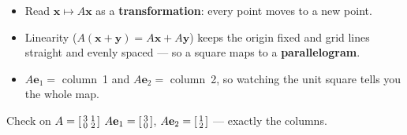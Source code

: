 \documentclass[aspectratio=169, 11pt]{beamer}
\newcommand{\ee}{\mathbf{e}}
\newcommand{\xx}{\mathbf{x}}
\newcommand{\yy}{\mathbf{y}}
\begin{document}
\begin{frame}[t, plain]
  \begin{itemize}
    \setlength{\itemsep}{5pt}
    \item Read $\xx\mapsto A\xx$ as a \textbf{transformation}: every point moves to a new point.
    \item Linearity ($A(\xx+\yy)=A\xx+A\yy$) keeps the origin fixed and grid lines straight and evenly
          spaced --- so a square maps to a \textbf{parallelogram}.
    \item $A\ee_1=$ column~1 and $A\ee_2=$ column~2, so watching the unit square tells you the whole map.
  \end{itemize}
  \vspace{2pt}
  \begin{block}{Check on $A=\begin{bsmallmatrix} 3 & 1\\ 0 & 2 \end{bsmallmatrix}$}
    $A\ee_1=\begin{bsmallmatrix} 3\\ 0\end{bsmallmatrix}$, \quad $A\ee_2=\begin{bsmallmatrix} 1\\ 2\end{bsmallmatrix}$
    --- exactly the columns.
  \end{block}
\end{frame}
\end{document}
